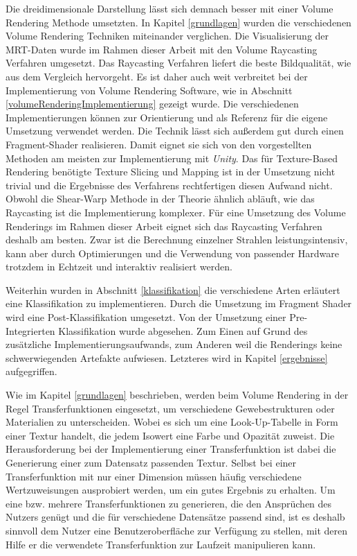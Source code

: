 Die dreidimensionale Darstellung lässt sich demnach besser mit einer Volume Rendering Methode umsetzten.  
In Kapitel \ref{grundlagen} wurden die verschiedenen Volume Rendering Techniken miteinander verglichen.
Die Visualisierung der MRT-Daten wurde im Rahmen dieser Arbeit mit den Volume Raycasting Verfahren umgesetzt.
Das Raycasting Verfahren liefert die beste Bildqualität, wie aus dem Vergleich hervorgeht. Es ist daher auch weit verbreitet bei der Implementierung von Volume Rendering Software, wie in Abschnitt \ref{volumeRenderingImplementierung} gezeigt wurde. 
Die verschiedenen Implementierungen können zur Orientierung und als Referenz für die eigene Umsetzung verwendet werden.
Die Technik lässt sich außerdem gut durch einen Fragment-Shader realisieren. Damit eignet sie sich von den vorgestellten Methoden am meisten zur Implementierung mit \textit{Unity}. 
Das für Texture-Based Rendering benötigte Texture Slicing und Mapping ist in der Umsetzung nicht trivial und die Ergebnisse des Verfahrens rechtfertigen diesen Aufwand nicht.
Obwohl die Shear-Warp Methode in der Theorie ähnlich abläuft, wie das Raycasting ist die Implementierung komplexer.
Für eine Umsetzung des Volume Renderings im Rahmen dieser Arbeit eignet sich das Raycasting Verfahren deshalb am besten.
Zwar ist die Berechnung einzelner Strahlen leistungsintensiv, kann aber durch Optimierungen und die Verwendung von passender Hardware trotzdem in Echtzeit und interaktiv realisiert werden.

Weiterhin wurden in Abschnitt \ref{klassifikation} die verschiedene Arten erläutert eine Klassifikation zu implementieren. Durch die Umsetzung im Fragment Shader wird eine Post-Klassifikation umgesetzt. 
Von der Umsetzung einer Pre-Integrierten Klassifikation wurde abgesehen. Zum Einen auf Grund des zusätzliche Implementierungsaufwands, zum Anderen weil die Renderings keine schwerwiegenden Artefakte aufwiesen. Letzteres wird in Kapitel \ref{ergebnisse} aufgegriffen.

Wie im Kapitel \ref{grundlagen} beschrieben, werden beim Volume Rendering in der Regel Transferfunktionen eingesetzt, um verschiedene Gewebestrukturen oder Materialien zu unterscheiden. Wobei es sich um eine Look-Up-Tabelle in Form einer Textur handelt, die jedem Isowert eine Farbe und Opazität zuweist.
Die Herausforderung bei der Implementierung einer Transferfunktion ist dabei die Generierung einer zum Datensatz passenden Textur. Selbst bei einer Transferfunktion mit nur einer Dimension müssen häufig verschiedene Wertzuweisungen ausprobiert werden, um ein gutes Ergebnis zu erhalten.
Um eine bzw. mehrere Transferfunktionen zu generieren, die den Ansprüchen des Nutzers genügt und die für verschiedene Datensätze passend sind, ist es deshalb sinnvoll dem Nutzer eine Benutzeroberfläche zur Verfügung zu stellen, mit deren Hilfe er die verwendete Transferfunktion zur Laufzeit manipulieren kann. 

